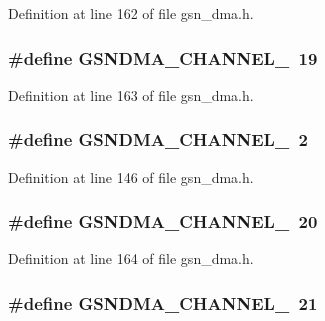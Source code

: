 Definition at line 162 of file gsn\_\-dma.h.

\hypertarget{a00484_aec041d8e41a8b26360fd73662dbdf0ad}{
\subsubsection[{GSNDMA\_\-CHANNEL\_\-19}]{\setlength{\rightskip}{0pt plus 5cm}\#define GSNDMA\_\-CHANNEL\_~19}}
\label{a00484_aec041d8e41a8b26360fd73662dbdf0ad}


Definition at line 163 of file gsn\_\-dma.h.

\hypertarget{a00484_a5deead63a92314854b45c055598c043c}{
\subsubsection[{GSNDMA\_\-CHANNEL\_\-2}]{\setlength{\rightskip}{0pt plus 5cm}\#define GSNDMA\_\-CHANNEL\_~2}}
\label{a00484_a5deead63a92314854b45c055598c043c}


Definition at line 146 of file gsn\_\-dma.h.

\hypertarget{a00484_a78570f42d54d0cceddf5ac3e76ef5883}{
\subsubsection[{GSNDMA\_\-CHANNEL\_\-20}]{\setlength{\rightskip}{0pt plus 5cm}\#define GSNDMA\_\-CHANNEL\_~20}}
\label{a00484_a78570f42d54d0cceddf5ac3e76ef5883}


Definition at line 164 of file gsn\_\-dma.h.

\hypertarget{a00484_a3e4b4c6574e761b8a7ca12976be7da2d}{
\subsubsection[{GSNDMA\_\-CHANNEL\_\-21}]{\setlength{\rightskip}{0pt plus 5cm}\#define GSNDMA\_\-CHANNEL\_~21}}
\label{a00484_a3e4b4c6574e761b8a7ca12976be7da2d}



